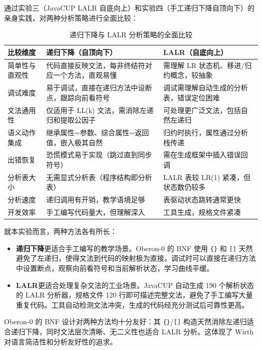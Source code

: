 通过实验三（JavaCUP LALR 自底向上）和实验四（手工递归下降自顶向下）的亲身实践，对两种分析策略进行全面比较：

\begin{table}[htbp]
    \centering\small
    \begin{tabular}{|p{3cm}|p{4.5cm}|p{4.5cm}|}
    \hline
    \textbf{比较维度} & \textbf{递归下降（自顶向下）} & \textbf{LALR（自底向上）} \\
    \hline
    简单性与直观性 & 代码直接反映文法，每非终结符对应一个方法，直观易懂 & 需理解 LR 状态机、移进/归约概念，较抽象 \\
    调试难度 & 易于调试，直接在递归方法中设断点，跟踪向前看符号 & 调试需理解自动生成的分析表，错误定位困难 \\
    文法通用性 & 仅适用于 LL(k) 文法，需消除左递归和提取公因子 & 可处理更广泛文法，包括自然左递归 \\
    语义动作集成 & 继承属性=参数、综合属性=返回值，嵌入极其自然 & 归约时执行，属性通过分析栈传递 \\
    出错恢复 & 恐慌模式易于实现（跳过直到同步符号） & 需在生成框架中插入错误回调 \\
    分析表大小 & 无需显式分析表（程序结构即分析表） & LALR 表较 LR(1) 紧凑，但状态数仍较多 \\
    分析速度 & 递归调用有开销，教学语境足够 & 表驱动状态跳转通常更快 \\
    开发效率 & 手工编写代码量大，但理解深入 & 工具生成，规格文件紧凑 \\
    \hline
    \end{tabular}
    \caption{递归下降与 LALR 分析策略的全面比较}
    \label{tab:parsing-compare}
\end{table}

就本实验而言，两种方法各有所长：

\begin{itemize}
    \item \textbf{递归下降}更适合手工编写的教学场景。Oberon-0 的 BNF 使用 \texttt{\{\}} 和 \texttt{[]} 天然避免了左递归，使得文法到代码的映射极为直接。调试时可以直接在递归方法中设置断点，观察向前看符号和当前解析状态，学习曲线平缓。
    \item \textbf{LALR}更适合处理复杂文法的工业场景。JavaCUP 自动生成 190 个解析状态的 LALR 分析器，规格文件 120 行即可描述完整文法，避免了手工编写大量重复代码。工具自动检测文法冲突，生成的代码经充分测试后可靠性更高。
\end{itemize}

Oberon-0 的 BNF 设计对两种方法均十分友好：其 \texttt{\{\}}/\texttt{[]} 构造天然消除左递归适合递归下降，同时文法层次清晰、无二义性也适合 LALR 分析。这体现了 Wirth 对语言简洁性和分析友好性的追求。

